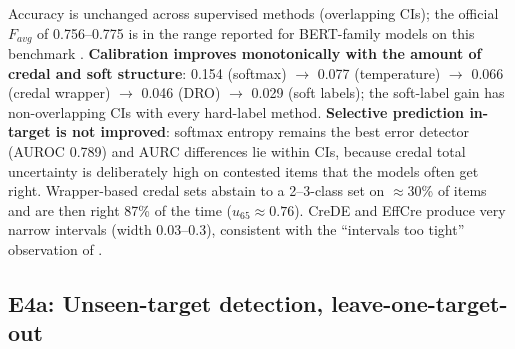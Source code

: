 \documentclass[11pt,a4paper]{article}
\begin{document}
Accuracy is unchanged across supervised methods (overlapping CIs); the official $F_{avg}$ of 0.756--0.775 is in the range reported for BERT-family models on this benchmark \cite{garg2024}. \textbf{Calibration improves monotonically with the amount of credal and soft structure}: 0.154 (softmax) $\to$ 0.077 (temperature) $\to$ 0.066 (credal wrapper) $\to$ 0.046 (DRO) $\to$ 0.029 (soft labels); the soft-label gain has non-overlapping CIs with every hard-label method. \textbf{Selective prediction in-target is not improved}: softmax entropy remains the best error detector (AUROC 0.789) and AURC differences lie within CIs, because credal total uncertainty is deliberately high on contested items that the models often get right. Wrapper-based credal sets abstain to a 2--3-class set on $\approx$30\% of items and are then right 87\% of the time ($u_{65}\approx0.76$). CreDE and EffCre produce very narrow intervals (width 0.03--0.3), consistent with the ``intervals too tight'' observation of \cite{credro2026}.

\subsection{E4a: Unseen-target detection, leave-one-target-out}
\end{document}
